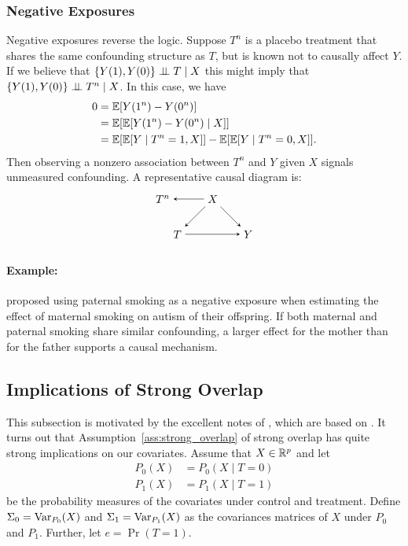 \documentclass[11pt]{exam}
\begin{document}
\subsubsection{Negative Exposures}
Negative exposures reverse the logic. 
Suppose $T^{n}$ is a placebo treatment that shares the same confounding structure as $T$, but is known not to causally affect $Y$. If we believe that $\{Y(1), Y(0)\} \perp\!\!\!\perp T \mid X$ this might imply that $ \{Y(1), Y(0)\} \perp\!\!\!\perp T^n \mid X$. In this case, we have
\begin{align*}
    0 &=\mathbb{E}[Y(1^n) - Y(0^n)] 
    \\
    &=\mathbb{E}[ \mathbb{E}[Y(1^n) - Y(0^n) \mid X]]
    \\
    &= \mathbb{E}[\mathbb{E}[Y \mid T^n = 1, X]] - \mathbb{E}[\mathbb{E}[Y \mid T^n = 0, X]].
\end{align*}
Then observing a nonzero association between $T^{n}$ and $Y$ given $X$ signals unmeasured confounding.
A representative causal diagram is:
\[
\begin{tikzpicture}[>=stealth, node distance=1.6cm]
  \node (X) {$X$};
  \node[below right of=X] (Y) {$Y$};
  \node[below left of=X] (T) {$T$};
   \node[left of=X] (Tn) {$T^n$};
  \draw[->] (X) -- (T);
  \draw[->] (X) -- (Y);
  \draw[->] (X) -- (Tn);
  \draw[->] (T) -- (Y);
\end{tikzpicture}
\]
\noindent
\paragraph{Example:}\citet{sanderson2018negative} proposed using paternal smoking as a negative exposure when estimating the effect of maternal smoking on autism of their offspring. If both maternal and paternal smoking share similar confounding, a larger effect for the mother than for the father supports a causal mechanism.

\subsection{Implications of Strong Overlap}
This subsection is motivated by the excellent notes of \citet[Section~20.1]{ding2023coursecausalinference}, which are based on \citet{d2021overlap}.
It turns out that Assumption~\ref{ass:strong_overlap} of strong overlap has quite strong implications on our covariates. Assume that $X \in \mathbb{R}^p$ and let
\begin{align*}
    P_0(X) &= P_0(X \mid T = 0)
    \\
    P_1(X) &= P_1(X \mid T = 1)
\end{align*}
be the probability measures of the covariates under control and treatment. Define $\Sigma_0 = \mathrm{Var}_{P_0}(X)$ and $\Sigma_1 = \mathrm{Var}_{P_1}(X)$ as the covariances matrices of $X$ under $P_0$ and $P_1$. Further, let $e = \Pr(T=1)$.
\end{document}
